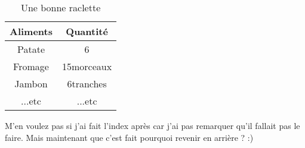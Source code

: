 \documentclass{article}
\begin{document}
\begin{table}[h]
    \centering
    \caption{Une bonne raclette} \vspace{5mm}
    \begin{tabular}{|c|c|}
    \hline
    Aliments & Quantité \\
    \hline
    Patate & 6 \\
    \hline
    Fromage & 15morceaux \\
    \hline
    Jambon & 6tranches \\
    \hline
    ...etc & ...etc \\
    \hline
    \end{tabular}
    \label{ma_raclette}
\end{table}
\vspace{5mm}
\justifying
M'en voulez pas si j'ai fait l'index après car j'ai pas remarquer qu'il fallait pas le faire. Mais maintenant que c'est fait pourquoi revenir en arrière ? :)
\newpage

\printindex
\end{document}
